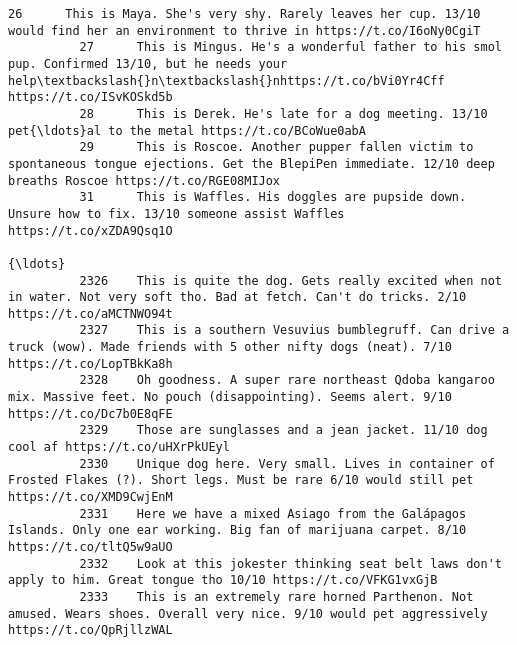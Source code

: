 \documentclass[11pt]{article}
\begin{document}
\begin{Verbatim}[commandchars=\\\{\}]
          26      This is Maya. She's very shy. Rarely leaves her cup. 13/10 would find her an environment to thrive in https://t.co/I6oNy0CgiT                                         
          27      This is Mingus. He's a wonderful father to his smol pup. Confirmed 13/10, but he needs your help\textbackslash{}n\textbackslash{}nhttps://t.co/bVi0Yr4Cff https://t.co/ISvKOSkd5b                   
          28      This is Derek. He's late for a dog meeting. 13/10 pet{\ldots}al to the metal https://t.co/BCoWue0abA                                                                       
          29      This is Roscoe. Another pupper fallen victim to spontaneous tongue ejections. Get the BlepiPen immediate. 12/10 deep breaths Roscoe https://t.co/RGE08MIJox           
          31      This is Waffles. His doggles are pupside down. Unsure how to fix. 13/10 someone assist Waffles https://t.co/xZDA9Qsq1O                                                
                                                                           {\ldots}                                                                                                          
          2326    This is quite the dog. Gets really excited when not in water. Not very soft tho. Bad at fetch. Can't do tricks. 2/10 https://t.co/aMCTNWO94t                          
          2327    This is a southern Vesuvius bumblegruff. Can drive a truck (wow). Made friends with 5 other nifty dogs (neat). 7/10 https://t.co/LopTBkKa8h                           
          2328    Oh goodness. A super rare northeast Qdoba kangaroo mix. Massive feet. No pouch (disappointing). Seems alert. 9/10 https://t.co/Dc7b0E8qFE                             
          2329    Those are sunglasses and a jean jacket. 11/10 dog cool af https://t.co/uHXrPkUEyl                                                                                     
          2330    Unique dog here. Very small. Lives in container of Frosted Flakes (?). Short legs. Must be rare 6/10 would still pet https://t.co/XMD9CwjEnM                          
          2331    Here we have a mixed Asiago from the Galápagos Islands. Only one ear working. Big fan of marijuana carpet. 8/10 https://t.co/tltQ5w9aUO                               
          2332    Look at this jokester thinking seat belt laws don't apply to him. Great tongue tho 10/10 https://t.co/VFKG1vxGjB                                                      
          2333    This is an extremely rare horned Parthenon. Not amused. Wears shoes. Overall very nice. 9/10 would pet aggressively https://t.co/QpRjllzWAL                           

\end{Verbatim}
\end{document}
